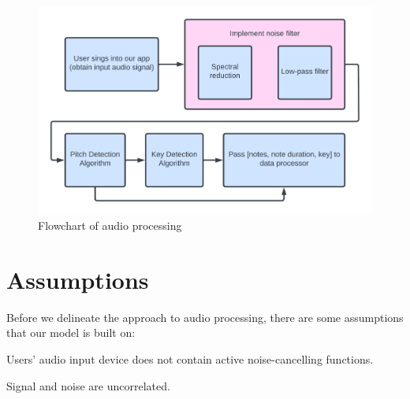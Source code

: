 

\begin{figure}
    \centering
    \includegraphics[width=0.8\columnwidth]{Figures/Audio Processing Flow Chart}
    \decoRule
    \caption{Flowchart of audio processing}
    \label{flowchart}
\end{figure}
\section{Assumptions}
\label{sec:asm}
Before we delineate the approach to audio processing, there are some assumptions that our model
is built on:

\begin{assumption}\label{as:1}
    Users' audio input device does not contain active noise-cancelling functions.
\end{assumption}

\begin{assumption}\label{as:2}
    Signal and noise are uncorrelated.
\end{assumption}

